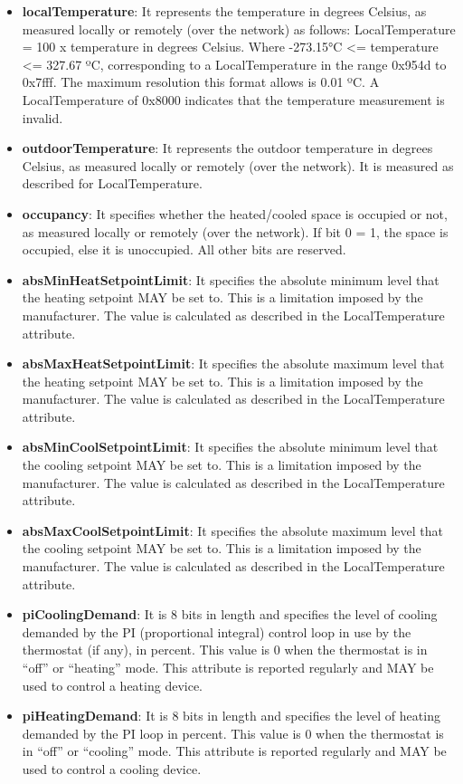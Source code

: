 \begin{itemize}
\item \textbf{localTemperature}:  	It represents the temperature in degrees Celsius, as measured locally or remotely (over the network) as follows: LocalTemperature = 100 x temperature in degrees Celsius. Where -273.15°C <= temperature <= 327.67 ºC, corresponding to a LocalTemperature in the range 0x954d to 0x7fff. The maximum resolution this format allows is 0.01 ºC. A LocalTemperature of 0x8000 indicates that the temperature measurement is invalid.
\item \textbf{outdoorTemperature}: It represents the outdoor temperature in degrees Celsius, as measured locally or remotely (over the network). It is measured as described for LocalTemperature.
\item \textbf{occupancy}: It specifies whether the heated/cooled space is occupied or not, as measured locally or remotely (over the network). If bit 0 = 1, the space is occupied, else it is unoccupied. All other bits are reserved.
\item \textbf{absMinHeatSetpointLimit}: It specifies the absolute minimum level that the heating setpoint MAY be set to. This is a limitation imposed by the manufacturer. The value is calculated as described in the LocalTemperature attribute.
\item \textbf{absMaxHeatSetpointLimit}: It specifies the absolute maximum level that the heating setpoint MAY be set to. This is a limitation imposed by the manufacturer. The value is calculated as described in the LocalTemperature attribute.
\item \textbf{absMinCoolSetpointLimit}: It  specifies the absolute minimum level that the cooling setpoint MAY be set to. This is a limitation imposed by the manufacturer. The value is calculated as described in the LocalTemperature attribute.
\item \textbf{absMaxCoolSetpointLimit}: It  specifies the absolute maximum level that the cooling setpoint MAY be set to. This is a limitation imposed by the manufacturer. The value is calculated as described in the LocalTemperature attribute.
\item \textbf{piCoolingDemand}: It is 8 bits in length and specifies the level of cooling demanded by the PI (proportional integral) control loop in use by the thermostat (if any), in percent. This value is 0 when the thermostat is in “off” or “heating” mode. This attribute is reported regularly and MAY be used to control a heating device.
\item \textbf{piHeatingDemand}: It is 8 bits in length and specifies the level of heating demanded by the PI loop in percent. This value is 0 when the thermostat is in “off” or “cooling” mode. This attribute is reported regularly and MAY be used to control a cooling device.

\end{itemize}

